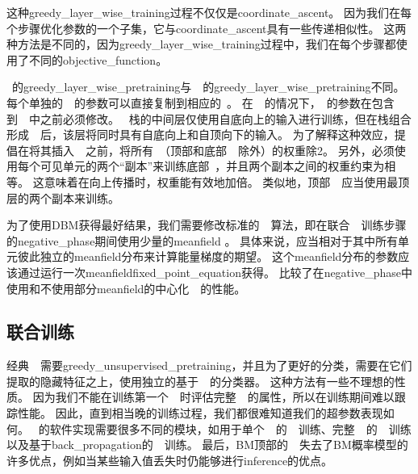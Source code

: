 
这种\gls{greedy_layer_wise_training}过程不仅仅是\gls{coordinate_ascent}。
因为我们在每个步骤优化参数的一个子集，它与\gls{coordinate_ascent}具有一些传递相似性。
这两种方法是不同的，因为\gls{greedy_layer_wise_training}过程中，我们在每个步骤都使用了不同的\gls{objective_function}。


~的\gls{greedy_layer_wise_pretraining}与~~的\gls{greedy_layer_wise_pretraining}不同。
每个单独的~~的参数可以直接复制到相应的~。
在~~的情况下，~的参数在包含到~~中之前必须修改。
~栈的中间层仅使用自底向上的输入进行训练，但在栈组合形成~~后，该层将同时具有自底向上和自顶向下的输入。
为了解释这种效应，\citet{SalHinton09}提倡在将其插入~~之前，将所有~（顶部和底部~~除外）的权重除2。
另外，必须使用每个可见单元的两个``副本''来训练底部~，并且两个副本之间的权重约束为相等。
这意味着在向上传播时，权重能有效地加倍。
类似地，顶部~~应当使用最顶层的两个副本来训练。

为了使用\gls{DBM}获得最好结果，我们需要修改标准的~~算法，即在联合~~训练步骤的\gls{negative_phase}期间使用少量的\gls{meanfield} \citep{SalHinton09}。
具体来说，应当相对于其中所有单元彼此独立的\gls{meanfield}分布来计算能量梯度的期望。
这个\gls{meanfield}分布的参数应该通过运行一次\gls{meanfield}\gls{fixed_point_equation}获得。
\citet{Goodfellow-et-al-NIPS2013}比较了在\gls{negative_phase}中使用和不使用部分\gls{meanfield}的中心化~~的性能。


\subsection{联合训练}
\label{sec:jointly_training_deep_boltzmann_machines}

经典~~需要\gls{greedy_unsupervised_pretraining}，并且为了更好的分类，需要在它们提取的隐藏特征之上，使用独立的基于~~的分类器。
这种方法有一些不理想的性质。
因为我们不能在训练第一个~~时评估完整~~的属性，所以在训练期间难以跟踪性能。
因此，直到相当晚的训练过程，我们都很难知道我们的超参数表现如何。
~的软件实现需要很多不同的模块，如用于单个~~的~~训练、完整~~的~~训练以及基于\gls{back_propagation}的~~训练。
最后，\gls{BM}顶部的~~失去了\gls{BM}概率模型的许多优点，例如当某些输入值丢失时仍能够进行\gls{inference}的优点。

